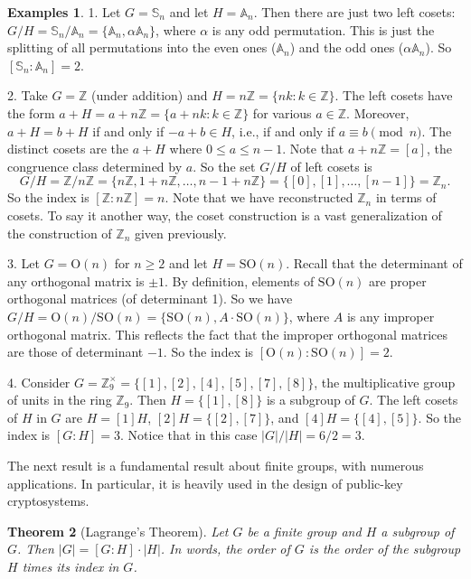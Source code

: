 \documentclass[11pt,oneside]{article}
\newtheorem{thm}{Theorem}[section]
\theoremstyle{definition}
\newtheorem{examples}[thm]{Examples}
\newcommand{\Z}{\mathbb{Z}} %
\renewcommand{\O}{\mathrm{O}}
\newcommand{\SO}{\mathrm{SO}}
\newcommand{\Sym}{\mathbb{S}}
\newcommand{\Alt}{\mathbb{A}}
\begin{document}
\begin{examples}
1. Let $G = \Sym_n$ and let $H = \Alt_n$. Then there are just two left
cosets: $G/H = \Sym_n/\Alt_n = \{ \Alt_n, \alpha \Alt_n \}$, where
$\alpha$ is any odd permutation. This is just the splitting of all
permutations into the even ones ($\Alt_n$) and the odd ones ($\alpha
\Alt_n$). So $[\Sym_n : \Alt_n] = 2$.

2. Take $G = \Z$ (under addition) and $H = n\Z = \{nk: k \in \Z
\}$. The left cosets have the form $a + H = a+n\Z = \{ a+nk : k\in \Z
\}$ for various $a\in \Z$. Moreover, $a+H=b+H$ if and only if $-a+b
\in H$, i.e., if and only if $a \equiv b \pmod{n}$. The distinct
cosets are the $a+H$ where $0\le a \le n-1$. Note that $a+n\Z = [a]$,
the congruence class determined by $a$. So the set $G/H$ of left
cosets is 
\[
  G/H = \Z/n\Z = \{n\Z, 1+n\Z, \dots, n-1 +n\Z \} = \{ 
  [0], [1], \dots, [n-1] \} = \Z_n.
\]
So the index is $[\Z: n\Z] = n$.  Note that we have reconstructed
$\Z_n$ in terms of cosets. To say it another way, the coset
construction is a vast generalization of the construction of $\Z_n$
given previously.

3. Let $G=\O(n)$ for $n \ge 2$ and let $H = \SO(n)$.  Recall that the
determinant of any orthogonal matrix is $\pm 1$. By definition,
elements of $\SO(n)$ are proper orthogonal matrices (of determinant
1).  So we have $G/H = \O(n)/\SO(n) = \{ \SO(n), A\cdot \SO(n) \}$,
where $A$ is any improper orthogonal matrix.  This reflects the fact
that the improper orthogonal matrices are those of determinant $-1$.
So the index is $[\O(n):\SO(n)]=2$.

4. Consider $G=\Z_9^\times = \{[1], [2], [4], [5], [7], [8] \}$, the
multiplicative group of units in the ring $\Z_9$. Then $H =
\{[1],[8]\}$ is a subgroup of $G$. The left cosets of $H$ in $G$ are
$H = [1]H$, $[2]H = \{[2],[7]\}$, and $[4]H = \{[4],[5]\}$. So the
index is $[G:H] = 3$. Notice that in this case $|G|/|H| = 6/2 = 3$.
\end{examples}



The next result is a fundamental result about finite groups, with
numerous applications. In particular, it is heavily used in the design
of public-key cryptosystems.

\begin{thm}[Lagrange's Theorem] 
\label{thm:Lagrange}%
Let $G$ be a finite group and $H$ a subgroup of $G$. Then $|G| = [G:H]
\cdot |H|$. In words, the order of $G$ is the order of the subgroup
$H$ times its index in $G$.
\end{thm}
\end{document}
